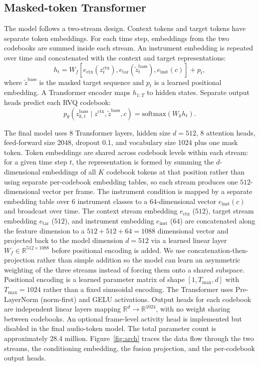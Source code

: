 \documentclass{article}
\begin{document}
\subsection{Masked-token Transformer}

The model follows a two-stream design. Context tokens and target tokens have separate token embeddings. For each time step, embeddings from the two codebooks are summed inside each stream. An instrument embedding is repeated over time and concatenated with the context and target representations:
\begin{equation}
    h_t = W_f [e_{\mathrm{ctx}}(z^{\mathrm{ctx}}_t), e_{\mathrm{tar}}(\tilde{z}^{\mathrm{bass}}_t), e_{\mathrm{inst}}(c)] + p_t,
\end{equation}
where $\tilde{z}^{\mathrm{bass}}$ is the masked target sequence and $p_t$ is a learned positional embedding. A Transformer encoder maps $h_{1:T}$ to hidden states. Separate output heads predict each RVQ codebook:
\begin{equation}
    p_\theta(z^{\mathrm{bass}}_{k,t} \mid z^{\mathrm{ctx}}, \tilde{z}^{\mathrm{bass}}, c)
    = \mathrm{softmax}(W_k h_t).
\end{equation}

The final model uses 8 Transformer layers, hidden size $d=512$, 8 attention heads, feed-forward size 2048, dropout 0.1, and vocabulary size 1024 plus one mask token. Token embeddings are shared across codebook levels within each stream: for a given time step $t$, the representation is formed by summing the $d$-dimensional embeddings of all $K$ codebook tokens at that position rather than using separate per-codebook embedding tables, so each stream produces one $512$-dimensional vector per frame. The instrument condition is mapped by a separate embedding table over $6$ instrument classes to a $64$-dimensional vector $e_{\mathrm{inst}}(c)$ and broadcast over time. The context stream embedding $e_{\mathrm{ctx}}$ ($512$), target stream embedding $e_{\mathrm{tar}}$ ($512$), and instrument embedding $e_{\mathrm{inst}}$ ($64$) are concatenated along the feature dimension to a $512+512+64=1088$ dimensional vector and projected back to the model dimension $d=512$ via a learned linear layer $W_f \in \mathbb{R}^{512 \times 1088}$ before positional encoding is added. We use concatenation-then-projection rather than simple addition so the model can learn an asymmetric weighting of the three streams instead of forcing them onto a shared subspace. Positional encoding is a learned parameter matrix of shape $[1, T_{\max}, d]$ with $T_{\max}=1024$ rather than a fixed sinusoidal encoding. The Transformer uses Pre-LayerNorm (norm-first) and GELU activations. Output heads for each codebook are independent linear layers mapping $\mathbb{R}^d \to \mathbb{R}^{1024}$, with no weight sharing between codebooks. An optional frame-level activity head is implemented but disabled in the final audio-token model. The total parameter count is approximately 28.4 million. Figure~\ref{fig:arch} traces the data flow through the two streams, the conditioning embedding, the fusion projection, and the per-codebook output heads.
\end{document}

